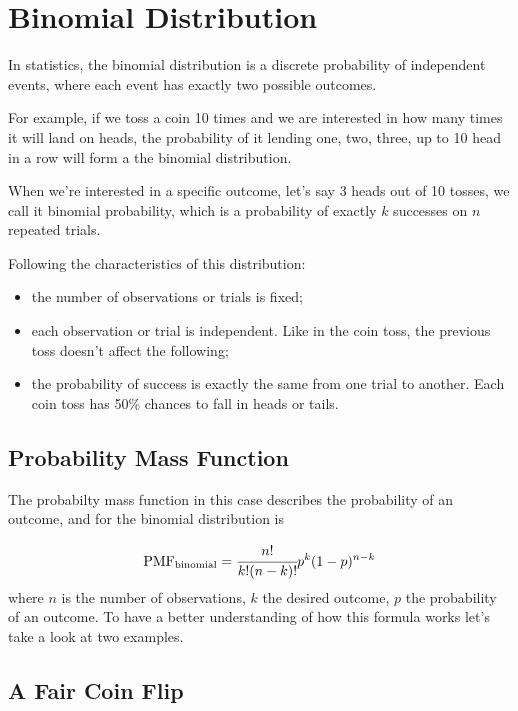 \chapter{Binomial Distribution}\label{binomial-distribution}

In statistics, the binomial distribution is a discrete probability of independent events, where each event has exactly two possible outcomes.

For example, if we toss a coin 10 times and we are interested in how many times it will land on heads, the probability of it lending one, two, three, up to 10 head in a row will form a the binomial distribution. 

When we're interested in a specific outcome, let's say 3 heads out of 10 tosses, we call it binomial probability, which is a probability of exactly \(k\) successes on \(n\) repeated trials.

Following the characteristics of this distribution:

\begin{itemize}
\tightlist
\item
  the number of observations or trials is fixed;
\item
  each observation or trial is independent. Like in the coin toss, the previous toss doesn't affect the following;
\item
  the probability of success is exactly the same from one trial to another. Each coin toss has 50\% chances to fall in heads or tails.
\end{itemize}

\section{Probability Mass Function}
\label{probability-mass-function}

The probabilty mass function in this case describes the probability of an outcome, and for the binomial distribution is

\begin{equation} \mathrm{PMF}_{\mathrm{binomial}} = \cfrac{n!}{k!(n-k)!}p^k (1-p)^{n-k}
\label{eq:binomial_pmf}
\end{equation}
where \(n\) is the number of observations, \(k\) the desired outcome, \(p\) the probability of an outcome. To have a better understanding of how this formula works let's take a look at two examples.

\section{A Fair Coin Flip}\label{a-fair-coin-flip}

